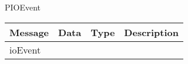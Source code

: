  {PIOEvent}
\begin{tabular}[ht]{|l|l|l|p{8cm}|}
\hline
Message & Data & Type & Description\\
\hline
ioEvent &  &  & \\
\hline
\end{tabular}
